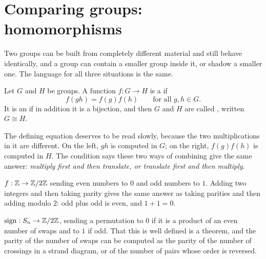 \section{Comparing groups: homomorphisms}\label{sec:homs}

Two groups can be built from completely different material and still behave identically, and a group
can contain a smaller group inside it, or shadow a smaller one. The language for all three
situations is the same.


\begin{defi}\label{def:hom}
Let $G$ and $H$ be groups. A function $f:G\to H$ is a  if
\[f(gh)=f(g)f(h)\qquad\text{for all }g,h\in G.\]
It is an  if in addition it is a bijection, and then $G$ and $H$ are called
, written $G\cong H$.
\end{defi}

The defining equation deserves to be read slowly, because the two multiplications in it are
different. On the left, $gh$ is computed in $G$; on the right, $f(g)f(h)$ is computed in $H$. The
condition says these two ways of combining give the same answer: \emph{multiply first and then
translate, or translate first and then multiply}.


\begin{exa}
$f:\mathbb{Z}\to\mathbb{Z}/2\mathbb{Z}$ sending even numbers to $0$ and odd numbers to $1$. Adding two integers and then
taking parity gives the same answer as taking parities and then adding modulo $2$: odd plus odd is
even, and $1+1=0$.
\end{exa}


\begin{exa}
$\mathrm{sign}:S_n\to\mathbb{Z}/2\mathbb{Z}$, sending a permutation to $0$ if it is a product of an even number of
swaps and to $1$ if odd. That this is well defined is a theorem, and the parity of the number of
swaps can be computed as the parity of the number of crossings in a strand diagram, or of the number
of pairs whose order is reversed.
\end{exa}

